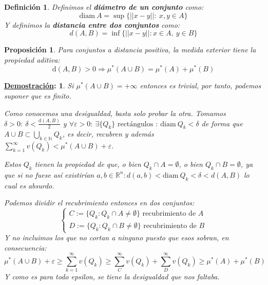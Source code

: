 \documentclass[10pt,a4paper,openright]{book}
\theoremstyle{break}
\newtheorem*{defi}{Definición}
\newtheorem*{prop}{Proposición}
\newtheorem*{demo}{\underline{Demostración}:}
\begin{document}
\begin{defi}
Definimos el \textbf{diámetro de un conjunto} como:
$$\mathrm{diam}\ A = \sup \{\vert \vert x - y \vert  \vert: \ x,y \in A\}$$
Y definimos la \textbf{distancia entre dos conjuntos} como:
$$d(A,B) = \inf \{||x-y||: x\in A, \ y \in B\}$$
\end{defi}

\begin{prop}
Para conjuntos a distancia positiva, la medida exterior tiene la propiedad aditiva:
$$\mathrm{d}\left( A, B \right) > 0 \Rightarrow \mu^*\left( A \cup B \right) = \mu^*\left( A \right) + \mu^*\left( B \right)$$
\end{prop}
\begin{demo}
Si $ \mu^*\left( A\cup B \right) = +\infty$ entonces es trivial, por tanto, podemos suponer que es finito.

Como conocemos una desigualdad, basta solo probar la otra. Tomamos $\delta > 0: \ \delta < \frac{\mathrm{d}\left( A, B \right)}{2}$ y $\forall \varepsilon > 0: \ \exists \{Q_k\} \text{ rectángulos }: \ \mathrm{diam}\ Q_k < \delta$ de forma que $A\cup B \subset \bigcup_{k \in \mathbb{N}} Q_k$, es decir, recubren y además $\sum_{k=1}^{\infty} v\left( Q_k \right) < \mu^*\left( A\cup B \right) + \varepsilon $.

Estos $Q_k$ tienen la propiedad de que, o bien $Q_k \cap A = \emptyset$, o bien $Q_k \cap B = \emptyset$, ya que si no fuese así existirían $a,b\in \mathbb{R}^n: d(a,b) < \mathrm{diam} \ Q_k < \delta < d(A,B)$ lo cual es absurdo. 

Podemos dividir el recubrimiento entonces en dos conjuntos:
$$ \begin{cases}
C:= \{Q_k : Q_k \cap A \neq \emptyset\} \text{ recubrimiento de } A \\
D:= \{Q_k : Q_k \cap B \neq \emptyset\} \text{ recubrimiento de } B
\end{cases}$$
Y no incluimos los que no cortan a ninguno puesto que esos sobran, en consecuencia:
$$\mu^*(A\cup B) +\varepsilon \geq \sum_{k=1}^{\infty} v\left( Q_k \right) \geq \sum_{C}^{\infty} v\left( Q_k \right) + \sum_{D}^{\infty} v\left( Q_k \right) \geq \mu^*\left( A \right) + \mu^*\left( B \right)$$
Y como es para todo epsilon, se tiene la desigualdad que nos faltaba.
\end{demo}
\end{document}
